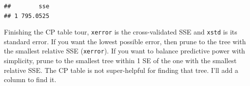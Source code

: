 \documentclass[
]{book}
\newenvironment{Shaded}{\begin{snugshade}}{\end{snugshade}}
\newcommand{\DataTypeTok}[1]{\textcolor[rgb]{0.13,0.29,0.53}{#1}}
\newcommand{\DecValTok}[1]{\textcolor[rgb]{0.00,0.00,0.81}{#1}}
\newcommand{\KeywordTok}[1]{\textcolor[rgb]{0.13,0.29,0.53}{\textbf{#1}}}
\newcommand{\NormalTok}[1]{#1}
\newcommand{\OperatorTok}[1]{\textcolor[rgb]{0.81,0.36,0.00}{\textbf{#1}}}
\newcommand{\OtherTok}[1]{\textcolor[rgb]{0.56,0.35,0.01}{#1}}
\newcommand{\StringTok}[1]{\textcolor[rgb]{0.31,0.60,0.02}{#1}}
\begin{document}
\begin{verbatim}
##        sse
## 1 795.0525
\end{verbatim}

Finishing the CP table tour, \texttt{xerror} is the cross-validated SSE and \texttt{xstd} is its standard error. If you want the lowest possible error, then prune to the tree with the smallest relative SSE (\texttt{xerror}). If you want to balance predictive power with simplicity, prune to the smallest tree within 1 SE of the one with the smallest relative SSE. The CP table is not super-helpful for finding that tree. I'll add a column to find it.

\begin{Shaded}
\end{Shaded}
\end{document}
